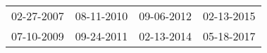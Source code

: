 \begin{supertabular}{llll}
 02-27-2007 &  08-11-2010 &  09-06-2012 &  02-13-2015 \\
 07-10-2009 &  09-24-2011 &  02-13-2014 &  05-18-2017 \\
\end{supertabular}
